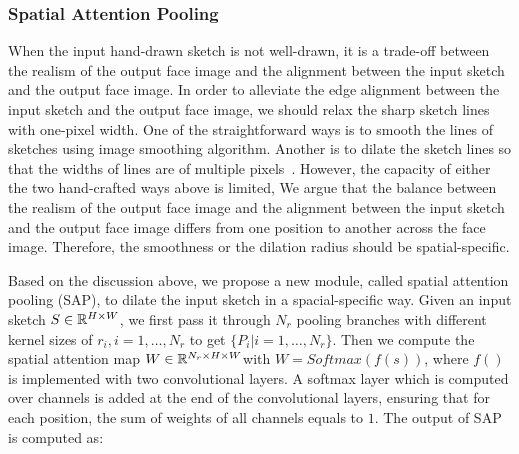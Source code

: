 
\subsubsection{Spatial Attention Pooling}
When the input hand-drawn sketch is not well-drawn, it is a trade-off between the realism of the output face image and the alignment between the input sketch and the output face image.
%
In order to alleviate the edge alignment between the input sketch and the output face image, we should relax the sharp sketch lines with one-pixel width.
One of the straightforward ways is to smooth the lines of sketches using image smoothing algorithm. 
Another is to dilate the sketch lines so that the widths of lines are of multiple pixels~\cite{DeepSurgery}.
However, the capacity of either the two hand-crafted ways above is limited, 
%
We argue that the balance between the realism of the output face image and the alignment between the input sketch and the output face image differs from one position to another across the face image. Therefore, the smoothness or the dilation radius should be spatial-specific. 

Based on the discussion above, we propose a new module, called spatial attention pooling (SAP), to dilate the input sketch in a spacial-specific way. 
Given an input sketch $S\in {\mathbb{R}}^{H\times W}$, we first pass it through $N_r$ pooling branches with different kernel sizes of $r_i, i=1,\ldots, N_r$ to get $\{P_{i}| i=1,\ldots,N_r\}$. 
Then we compute the spatial attention map $W\in {\mathbb{R}}^{N_r\times H\times W} $with $W = Softmax(f(s))$, where $f()$ is implemented with two convolutional layers. 
%
A softmax layer which is computed over channels is added at the end of the convolutional layers, ensuring that for each position, the sum of weights of all channels equals to $1$. The output of SAP is computed as:
	
